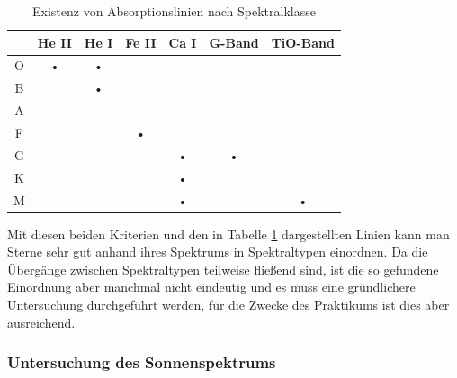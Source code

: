 \begin{table}
\centering
\begin{tabular}{c|c|c|c|c|c|c}

 & He II & He I & Fe II & Ca I & G-Band & TiO-Band \\ 
\hline 
O & • & • &  &  &  &  \\ 
\hline 
B &  & • &  &  &  &  \\ 
\hline 
A &  &  &  &  &  &  \\ 
\hline 
F &  &  & • &  &  & \\ 
\hline
G &  &  &  & • & • &  \\ 
\hline 
K &  &  &  & • &  &  \\ 
\hline 
M &  &  &  & • &  & • \\ 
\end{tabular}
\caption{Existenz von Absorptionslinien nach Spektralklasse}
\label{tab:Spektral}
\end{table}

Mit diesen beiden Kriterien und den in Tabelle \ref{tab:Spektral} dargestellten Linien kann man Sterne sehr gut anhand ihres Spektrums in Spektraltypen einordnen. Da die Übergänge zwischen Spektraltypen teilweise fließend sind, ist die so gefundene Einordnung aber manchmal nicht eindeutig und es muss eine gründlichere Untersuchung durchgeführt werden, für die Zwecke des Praktikums ist dies aber ausreichend.

\subsubsection{Untersuchung des Sonnenspektrums}
